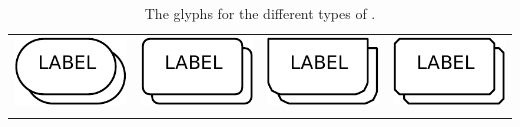 \begin{table}[h]
\begin{tabu}{X[c,m]X[c,m]X[c,m]X[c,m]}
    \toprule
    \includegraphics[valign=m]{images/build/simple_chemical_multimer.pdf} & \includegraphics[valign=m]{images/build/macromolecule_multimer.pdf} & \includegraphics[valign=m]{images/build/genetic_multimer.pdf} & \includegraphics[valign=m]{images/build/complex_multimer.pdf}\\[0.5cm]
     &  &  & \\
	\bottomrule
\end{tabu}
\caption{The \PD glyphs for the different types of .}
\label{tab:multimer_containers}
\end{table}
